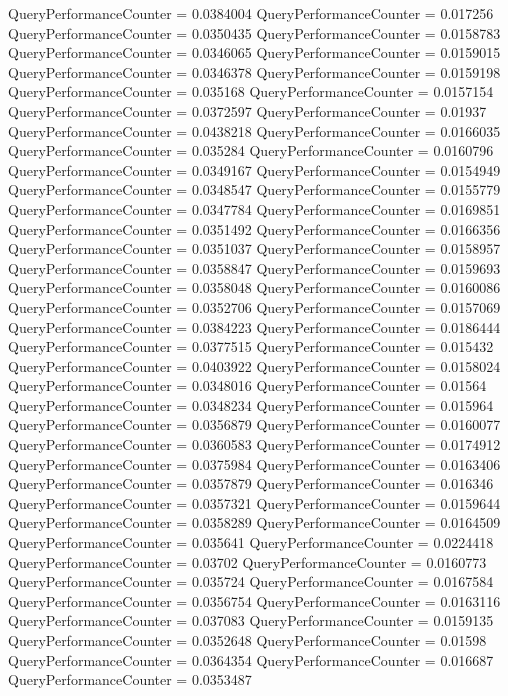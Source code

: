 \documentclass[9pt]{article}
\theoremstyle{plain}
\theoremstyle{definition}
\theoremstyle{remark}
\numberwithin{equation}{section}
\begin{document}
QueryPerformanceCounter  =  0.0384004
QueryPerformanceCounter  =  0.017256
QueryPerformanceCounter  =  0.0350435
QueryPerformanceCounter  =  0.0158783
QueryPerformanceCounter  =  0.0346065
QueryPerformanceCounter  =  0.0159015
QueryPerformanceCounter  =  0.0346378
QueryPerformanceCounter  =  0.0159198
QueryPerformanceCounter  =  0.035168
QueryPerformanceCounter  =  0.0157154
QueryPerformanceCounter  =  0.0372597
QueryPerformanceCounter  =  0.01937
QueryPerformanceCounter  =  0.0438218
QueryPerformanceCounter  =  0.0166035
QueryPerformanceCounter  =  0.035284
QueryPerformanceCounter  =  0.0160796
QueryPerformanceCounter  =  0.0349167
QueryPerformanceCounter  =  0.0154949
QueryPerformanceCounter  =  0.0348547
QueryPerformanceCounter  =  0.0155779
QueryPerformanceCounter  =  0.0347784
QueryPerformanceCounter  =  0.0169851
QueryPerformanceCounter  =  0.0351492
QueryPerformanceCounter  =  0.0166356
QueryPerformanceCounter  =  0.0351037
QueryPerformanceCounter  =  0.0158957
QueryPerformanceCounter  =  0.0358847
QueryPerformanceCounter  =  0.0159693
QueryPerformanceCounter  =  0.0358048
QueryPerformanceCounter  =  0.0160086
QueryPerformanceCounter  =  0.0352706
QueryPerformanceCounter  =  0.0157069
QueryPerformanceCounter  =  0.0384223
QueryPerformanceCounter  =  0.0186444
QueryPerformanceCounter  =  0.0377515
QueryPerformanceCounter  =  0.015432
QueryPerformanceCounter  =  0.0403922
QueryPerformanceCounter  =  0.0158024
QueryPerformanceCounter  =  0.0348016
QueryPerformanceCounter  =  0.01564
QueryPerformanceCounter  =  0.0348234
QueryPerformanceCounter  =  0.015964
QueryPerformanceCounter  =  0.0356879
QueryPerformanceCounter  =  0.0160077
QueryPerformanceCounter  =  0.0360583
QueryPerformanceCounter  =  0.0174912
QueryPerformanceCounter  =  0.0375984
QueryPerformanceCounter  =  0.0163406
QueryPerformanceCounter  =  0.0357879
QueryPerformanceCounter  =  0.016346
QueryPerformanceCounter  =  0.0357321
QueryPerformanceCounter  =  0.0159644
QueryPerformanceCounter  =  0.0358289
QueryPerformanceCounter  =  0.0164509
QueryPerformanceCounter  =  0.035641
QueryPerformanceCounter  =  0.0224418
QueryPerformanceCounter  =  0.03702
QueryPerformanceCounter  =  0.0160773
QueryPerformanceCounter  =  0.035724
QueryPerformanceCounter  =  0.0167584
QueryPerformanceCounter  =  0.0356754
QueryPerformanceCounter  =  0.0163116
QueryPerformanceCounter  =  0.037083
QueryPerformanceCounter  =  0.0159135
QueryPerformanceCounter  =  0.0352648
QueryPerformanceCounter  =  0.01598
QueryPerformanceCounter  =  0.0364354
QueryPerformanceCounter  =  0.016687
QueryPerformanceCounter  =  0.0353487
\end{document}
